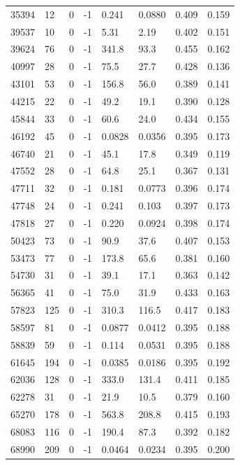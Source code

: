 \documentclass[preview]{standalone}
\begin{document}
{{\begin{tabular}{L{1.2cm}C{1.2cm} C{0.3cm}C{0.5cm} C{1.4cm}C{1.4cm} C{1.4cm}C{1.4cm}}
  35394  &    12  & 0     & -1 &  0.241  & 0.0880  & 0.409 &  0.159   \\ 
  39537  &    10  & 0     & -1 &  5.31  & 2.19  & 0.402 &  0.151   \\ 
  39624  &    76  & 0     & -1 &  341.8  & 93.3  & 0.455 &  0.162   \\ 
  40997  &    28  & 0     & -1 &  75.5  & 27.7  & 0.428 &  0.136   \\ 
  43101  &    53  & 0     & -1 &  156.8  & 56.0  & 0.389 &  0.141   \\ 
  44215  &    22  & 0     & -1 &  49.2  & 19.1  & 0.390 &  0.128   \\ 
  45844  &    33  & 0     & -1 &  60.6  & 24.0  & 0.434 &  0.155   \\ 
  46192  &    45  & 0     & -1 &  0.0828  & 0.0356  & 0.395 &  0.173   \\ 
  46740  &    21  & 0     & -1 &  45.1  & 17.8  & 0.349 &  0.119   \\ 
  47552  &    28  & 0     & -1 &  64.8  & 25.1  & 0.367 &  0.131   \\ 
  47711  &    32  & 0     & -1 &  0.181  & 0.0773  & 0.396 &  0.174   \\ 
  47748  &    24  & 0     & -1 &  0.241  & 0.103  & 0.397 &  0.173   \\ 
  47818  &    27  & 0     & -1 &  0.220  & 0.0924  & 0.398 &  0.174   \\ 
  50423  &    73  & 0     & -1 &  90.9  & 37.6  & 0.407 &  0.153   \\ 
  53473  &    77  & 0     & -1 &  173.8  & 65.6  & 0.381 &  0.160   \\ 
  54730  &    31  & 0     & -1 &  39.1  & 17.1  & 0.363 &  0.142   \\ 
  56365  &    41  & 0     & -1 &  75.0  & 31.9  & 0.433 &  0.163   \\ 
  57823  &   125  & 0     & -1 &  310.3  & 116.5  & 0.417 &  0.183   \\ 
  58597  &    81  & 0     & -1 &  0.0877  & 0.0412  & 0.395 &  0.188   \\ 
  58839  &    59  & 0     & -1 &  0.114  & 0.0531  & 0.395 &  0.188   \\ 
  61645  &   194  & 0     & -1 &  0.0385  & 0.0186  & 0.395 &  0.192   \\ 
  62036  &   128  & 0     & -1 &  333.0  & 131.4  & 0.411 &  0.185   \\ 
  62278  &    31  & 0     & -1 &  21.9  & 10.5  & 0.379 &  0.160   \\ 
  65270  &   178  & 0     & -1 &  563.8  & 208.8  & 0.415 &  0.193   \\ 
  68083  &   116  & 0     & -1 &  190.4  & 87.3  & 0.392 &  0.182   \\ 
  68990  &   209  & 0     & -1 &  0.0464  & 0.0234  & 0.395 &  0.200   \\ 
\hline 
\end{tabular} 

}}
\end{document}
